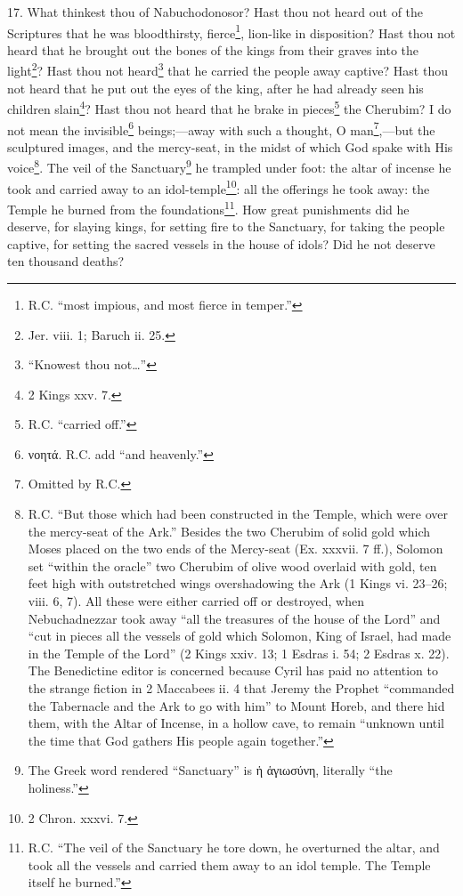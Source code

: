 17. What thinkest thou of Nabuchodonosor? Hast thou not heard out of the Scriptures that he was bloodthirsty, fierce\footnote{R.C. “most impious, and most fierce in temper.”}, lion-like in disposition? Hast thou not heard that he brought out the bones of the kings from their graves into the light\footnote{Jer. viii. 1; Baruch ii. 25.}? Hast thou not heard\footnote{“Knowest thou not…”} that he carried the people away captive? Hast thou not heard that he put out the eyes of the king, after he had already seen his children slain\footnote{2 Kings xxv. 7.}? Hast thou not heard that he brake in pieces\footnote{R.C. “carried off.”} the Cherubim? I do not mean the invisible\footnote{\textgreek{νοητά}. R.C. add “and heavenly.”} beings;—away with such a thought, O man\footnote{Omitted by R.C.},—but the sculptured images, and the mercy-seat, in the midst of which God spake with His voice\footnote{R.C. “But those which had been constructed in the Temple, which were over the mercy-seat of the Ark.” Besides the two Cherubim of solid gold which Moses placed on the two ends of the Mercy-seat (Ex. xxxvii. 7 ff.), Solomon set “within the oracle” two Cherubim of olive wood overlaid with gold, ten feet high with outstretched wings overshadowing the Ark (1 Kings vi. 23–26; viii. 6, 7). All these were either carried off or destroyed, when Nebuchadnezzar took away “all the treasures of the house of the Lord” and “cut in pieces all the vessels of gold which Solomon, King of Israel, had made in the Temple of the Lord” (2 Kings xxiv. 13; 1 Esdras i. 54; 2 Esdras x. 22). The Benedictine editor is concerned because Cyril has paid no attention to the strange fiction in 2 Maccabees ii. 4 that Jeremy the Prophet “commanded the Tabernacle and the Ark to go with him” to Mount Horeb, and there hid them, with the Altar of Incense, in a hollow cave, to remain “unknown until the time that God gathers His people again together.”}. The veil of the Sanctuary\footnote{The Greek word rendered “Sanctuary” is \textgreek{ἡ ἁγιωσύνη}, literally “the holiness.”} he trampled under foot: the altar of incense he took and carried away to an idol-temple\footnote{2 Chron. xxxvi. 7.}: all the offerings he took away: the Temple he burned from the foundations\footnote{R.C. “The veil of the Sanctuary he tore down, he overturned the altar, and took all the vessels and carried them away to an idol temple. The Temple itself he burned.”}. How great punishments did he deserve, for slaying kings, for setting fire to the Sanctuary, for taking the people captive, for setting the sacred vessels in the house of idols? Did he not deserve ten thousand deaths?

